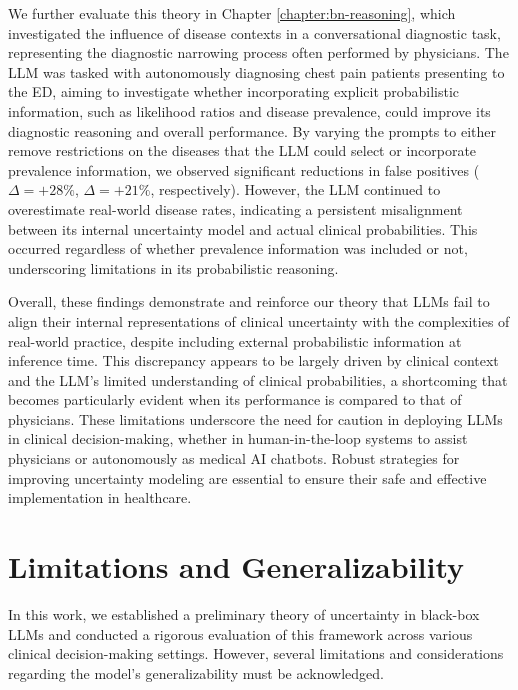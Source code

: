 We further evaluate this theory in Chapter \ref{chapter:bn-reasoning}, which investigated the influence of disease contexts in a conversational diagnostic task, representing the diagnostic narrowing process often performed by physicians. The LLM was tasked with autonomously diagnosing chest pain patients presenting to the ED, aiming to investigate whether incorporating explicit probabilistic information, such as likelihood ratios and disease prevalence, could improve its diagnostic reasoning and overall performance. By varying the prompts to either remove restrictions on the diseases that the LLM could select or incorporate prevalence information, we observed significant reductions in false positives ($\Delta=+28\%$, $\Delta=+21\%$, respectively). However, the LLM continued to overestimate real-world disease rates, indicating a persistent misalignment between its internal uncertainty model and actual clinical probabilities. This occurred regardless of whether prevalence information was included or not, underscoring limitations in its probabilistic reasoning.

Overall, these findings demonstrate and reinforce our theory that LLMs fail to align their internal representations of clinical uncertainty with the complexities of real-world practice, despite including external probabilistic information at inference time. This discrepancy appears to be largely driven by clinical context and the LLM's limited understanding of clinical probabilities, a shortcoming that becomes particularly evident when its performance is compared to that of physicians. These limitations underscore the need for caution in deploying LLMs in clinical decision-making, whether in human-in-the-loop systems to assist physicians or autonomously as medical AI chatbots. Robust strategies for improving uncertainty modeling are essential to ensure their safe and effective implementation in healthcare.

\section{Limitations and Generalizability}
In this work, we established a preliminary theory of uncertainty in black-box LLMs and conducted a rigorous evaluation of this framework across various clinical decision-making settings. However, several limitations and considerations regarding the model’s generalizability must be acknowledged. 


